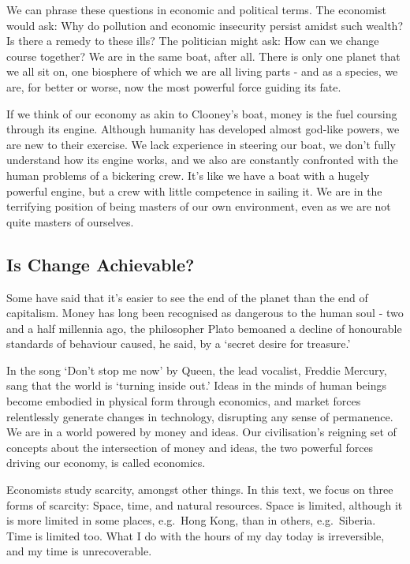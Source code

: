 \documentclass[]{tufte-handout}
\begin{document}
We can phrase these questions in economic and political terms. The
economist would ask: Why do pollution and economic insecurity persist
amidst such wealth? Is there a remedy to these ills? The politician
might ask: How can we change course together? We are in the same boat,
after all. There is only one planet that we all sit on, one biosphere of
which we are all living parts - and as a species, we are, for better or
worse, now the most powerful force guiding its fate.

If we think of our economy as akin to Clooney's boat, money is the fuel
coursing through its engine. Although humanity has developed almost
god-like powers, we are new to their exercise. We lack experience in
steering our boat, we don't fully understand how its engine works, and
we also are constantly confronted with the human problems of a bickering
crew. It's like we have a boat with a hugely powerful engine, but a crew
with little competence in sailing it. We are in the terrifying position
of being masters of our own environment, even as we are not quite
masters of ourselves.

\hypertarget{is-change-achievable}{%
\subsection{Is Change Achievable?}\label{is-change-achievable}}

Some have said that it's easier to see the end of the planet than the
end of capitalism. Money has long been recognised as dangerous to the
human soul - two and a half millennia ago, the philosopher Plato
bemoaned a decline of honourable standards of behaviour caused, he said,
by a `secret desire for treasure.'

In the song `Don't stop me now' by Queen, the lead vocalist, Freddie
Mercury, sang that the world is `turning inside out.' Ideas in the minds
of human beings become embodied in physical form through economics, and
market forces relentlessly generate changes in technology, disrupting
any sense of permanence. We are in a world powered by money and ideas.
Our civilisation's reigning set of concepts about the intersection of
money and ideas, the two powerful forces driving our economy, is called
economics.

Economists study scarcity, amongst other things. In this text, we focus
on three forms of scarcity: Space, time, and natural resources. Space is
limited, although it is more limited in some places, e.g.~Hong Kong,
than in others, e.g.~Siberia. Time is limited too. What I do with the
hours of my day today is irreversible, and my time is unrecoverable.
\end{document}
